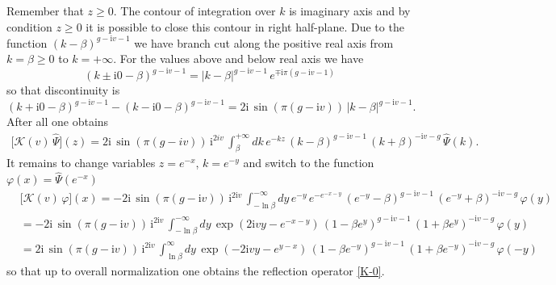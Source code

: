 \documentclass[11pt]{article}
\numberwithin{equation}{section}
\theoremstyle{plain}
\theoremstyle{definition}
\renewcommand{\phi}{\varphi}
\renewcommand{\imath}{\mathrm{i}}
\begin{document}
Remember that $z \geq 0$. The contour of integration over $k$ is imaginary axis and by condition $z \geq 0$ it is possible to close this contour in right half-plane. Due to the function $(k-\beta)^{g-\imath v-1}$ we have 
branch cut along the positive real axis from   
$k = \beta \geq 0$ to  $k = +\infty$. 
For the values above and below real axis we have 
$$
(k\pm \imath 0-\beta)^{g-\imath v-1} = |k-\beta|^{g-\imath v-1}\,e^{\mp \imath \pi(g-\imath v-1)}
$$ 
so that discontinuity is 
$$
(k+\imath 0-\beta)^{g-\imath v-1} - (k-\imath 0-\beta)^{g-\imath v-1} =  
2\imath\,\sin(\pi(g-\imath v))\,|k-\beta|^{g-\imath v-1}.
$$
After all one obtains 
\begin{align*}
	\bigl[\mathcal{K}(v)\,\hat{\Psi}\bigr](z) 
	= 2\imath \,\sin(\pi(g-iv))\,\imath^{2iv}\,
	\int_{\beta}^{+\infty} d k\, e^{-k z}\,
	(k-\beta)^{g-\imath v-1}\,(k+\beta)^{-\imath v-g}\,\hat{\Psi}(k).
\end{align*}
It remains to change variables $z = e^{-x}$, 
$k = e^{-y}$ and switch to the function 
$\phi(x) = \hat{\Psi}\left(e^{-x}\right)$ 
\begin{align*}
	&\bigl[\mathcal{K}(v)\,\phi\bigr](x) 
	= -2\imath\,\sin(\pi(g-\imath v))\,\imath^{2\imath v}\,
	\int_{-\ln\beta}^{-\infty} d y\, e^{-y}\, e^{-e^{-x-y}}\,
	(e^{-y}-\beta)^{g-\imath v-1}\,(e^{-y}+\beta)^{-\imath v-g}\,\phi(y) \\
	& = -2\imath\,\sin(\pi(g-\imath v))\,\imath^{2\imath v}\,
	\int_{-\ln\beta}^{-\infty} d y\, \exp\left(2\imath v y - e^{-x-y}\right)\,
	(1-\beta e^{y})^{g-\imath v-1}\,(1+\beta e^{y})^{-\imath v-g}\,\phi(y) \\ 
	& = 2\imath\,\sin(\pi(g-\imath v))\,\imath^{2\imath v}\,
	\int_{\ln\beta}^{\infty} d y\, \exp\left(-2\imath v y - e^{y-x}\right)\,
	(1-\beta e^{-y})^{g-\imath v-1}\,(1+\beta e^{-y})^{-\imath v-g}\,\phi(-y)
\end{align*}
so that up to overall normalization one obtains 
the reflection operator \eqref{K-0}.
\end{document}

